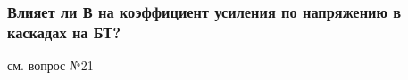 \subsubsection{Влияет ли В на коэффициент усиления по напряжению в каскадах на БТ?}

см. вопрос №21
